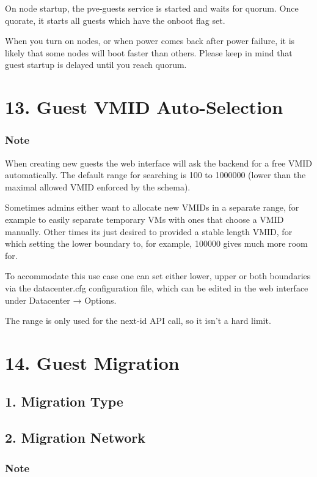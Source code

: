 On node startup, the pve-guests service is started and waits for quorum. Once quorate, it starts all guests which have the onboot flag set.

When you turn on nodes, or when power comes back after power failure, it is likely that some nodes will boot faster than others. Please keep in mind that guest startup is delayed until you reach quorum.


\section{13. Guest VMID Auto-Selection}

\subsubsection{Note}

When creating new guests the web interface will ask the backend for a free VMID automatically. The default range for searching is 100 to 1000000 (lower than the maximal allowed VMID enforced by the schema).

Sometimes admins either want to allocate new VMIDs in a separate range, for example to easily separate temporary VMs with ones that choose a VMID manually. Other times its just desired to provided a stable length VMID, for which setting the lower boundary to, for example, 100000 gives much more room for.

To accommodate this use case one can set either lower, upper or both boundaries via the datacenter.cfg configuration file, which can be edited in the web interface under Datacenter → Options.

The range is only used for the next-id API call, so it isn’t a hard limit.


\section{14. Guest Migration}

\subsection{1. Migration Type}

\subsection{2. Migration Network}

\subsubsection{Note}

